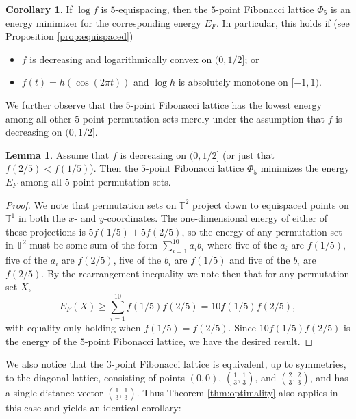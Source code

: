 \documentclass[a4paper,12pt]{article}
\numberwithin{equation}{section}
\theoremstyle{definition}
\newtheorem{lem}[thm]{Lemma}
\newtheorem{cor}[thm]{Corollary}
\begin{document}
\begin{cor}\label{cor:5}
    If  $\log f$ is $5$-equispacing, then the  $5$-point Fibonacci lattice $\Phi_5$ is an energy minimizer for the corresponding energy $E_F$. In particular, this holds if  (see Proposition \ref{prop:equispaced})
    \begin{itemize}
    \item $f$ is decreasing and logarithmically convex on $(0,1/2]$; or
    \item $f (t) = h (\cos (2\pi t))$ and $\log h$ is absolutely monotone on $[-1,1)$. 
    \end{itemize}
\end{cor}

We further observe that the $5$-point Fibonacci lattice has the lowest energy  among all other $5$-point permutation sets merely under the assumption that $f$ is decreasing  on $(0,1/2]$. 


\begin{lem}\label{lem:5perm}
Assume that $f$ is decreasing  on $(0,1/2]$ (or just that $f(2/5)< f(1/5)$). 
    Then the  $5$-point Fibonacci lattice $\Phi_5$ minimizes the energy $E_F$  among all $5$-point permutation sets.
\end{lem}

\begin{proof}
    We note that permutation sets on $\mathbb{T}^2$ project down to equispaced points on $\mathbb{T}^1$ in both the $x$- and $y$-coordinates. The one-dimensional energy of either of these projections is $5f(1/5)+5f(2/5)$, so the energy of any permutation set in $\mathbb{T}^2$ must be some sum of the form $\sum_{i=1}^{10}a_ib_i$ where five of the $a_i$ are $f(1/5)$, five of the $a_i$ are $f(2/5)$, five of the $b_i$ are $f(1/5)$ and five of the $b_i$ are $f(2/5)$. By the rearrangement inequality \cite{HLP88} we note then that for any permutation set $X$, $$E_F(X)\ge \sum_{i=1}^{10}f(1/5)f(2/5)=10f(1/5)f(2/5),$$ with equality only holding when $f(1/5)=f(2/5)$. Since $10f(1/5)f(2/5)$ is the energy of the $5$-point Fibonacci lattice, we have the desired result. 
\end{proof}


We also notice that the $3$-point Fibonacci lattice  is   equivalent, up to symmetries,  to the diagonal lattice, consisting of points  $\left(0, 0 \right)$, $\left(\frac13, \frac13 \right)$, and   $\left(\frac23, \frac23 \right)$, and has a single distance vector $\left(\frac13, \frac13 \right)$. Thus Theorem \ref{thm:optimality} also applies in this case and yields an identical corollary:
\end{document}
